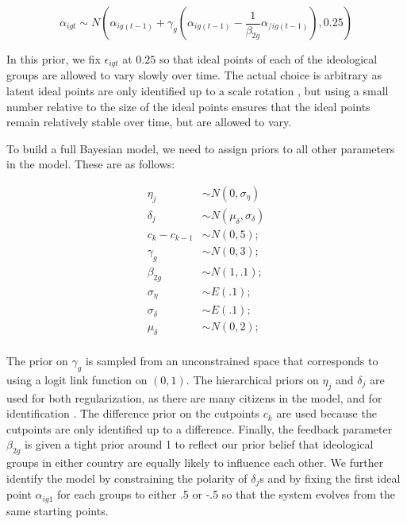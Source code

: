 \documentclass[12pt]{article}
\begin{document}
\begin{equation*}
\alpha_{igt}  \sim N(\alpha_{ig(t-1)} + \gamma_g (\alpha_{ig(t-1)} - \frac{1}{\beta_{2g}}  \alpha_{/ig(t-1)}),0.25)
\end{equation*}

In this prior, we fix $\epsilon_{igt}$ at $0.25$ so that ideal points of each of the ideological groups are allowed to vary slowly over time. The actual choice is arbitrary as latent ideal points are only identified up to a scale rotation \parencite{gelman2005}, but using a small number relative to the size of the ideal points ensures that the ideal points remain relatively stable over time, but are allowed to vary.

To build a full Bayesian model, we need to assign priors to all other parameters in the model. These are as follows:

\begin{align*}
	\eta_j &\sim N(0,\sigma_{\eta})\\
	\delta_j &\sim N(\mu_{\delta},\sigma_{\delta}) \\
	c_{k} - c_{k-1} &\sim N(0,5);\\
	\gamma_g &\sim N(0,3);\\
	\beta_{2g} &\sim  N(1,.1);\\
	\sigma_{\eta} &\sim E(.1);\\
	\sigma_{\delta} &\sim E(.1);\\
	\mu_{\delta} &\sim N(0,2);\\
\end{align*}

The prior on $\gamma_g$ is sampled from an unconstrained space that corresponds to using a logit link function on $(0,1)$. The hierarchical priors on $\eta_j$ and $\delta_j$ are used for both regularization, as there are many citizens in the model, and for identification \parencite{gelman2005}. The difference prior on the cutpoints $c_k$ are used because the cutpoints are only identified up to a difference. Finally, the feedback parameter $\beta_{2g}$ is given a tight prior around 1 to reflect our prior belief that ideological groups in either country are equally likely to influence each other. We further identify the model by constraining the polarity of $\delta_j$s and by fixing the first ideal point $\alpha_{ig1}$ for each groups to either .5 or -.5 so that the system evolves from the same starting points.
\end{document}
